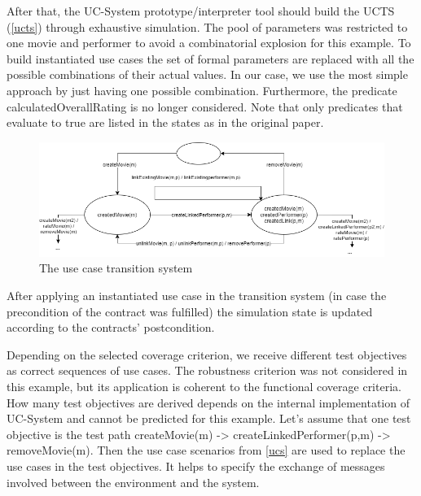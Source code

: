 After that, the UC-System prototype/interpreter tool should build the UCTS (\autoref{ucts}) through exhaustive simulation. The pool of parameters was restricted to one movie and performer to avoid a combinatorial explosion for this example. To build instantiated use cases the set of formal parameters are replaced with all the possible combinations of their actual values. In our case, we use the most simple approach by just having one possible combination. Furthermore, the predicate calculatedOverallRating is no longer considered. Note that only predicates that evaluate to true are listed in the states as in the original paper. 

\begin{figure}[h]
	\centering
	\includegraphics[width=\textwidth]{../images/topic3_ucts.png}
	\caption{The use case transition system}
	\label{ucts}
\end{figure}

\newpage
After applying an instantiated use case in the transition system (in case the precondition of the contract was fulfilled) the simulation state is updated according to the contracts' postcondition. 

Depending on the selected coverage criterion, we receive different test objectives as correct sequences of use cases. The robustness criterion was not considered in this example, but its application is coherent to the functional coverage criteria. How many test objectives are derived depends on the internal implementation of UC-System and cannot be predicted for this example. Let's assume that one test objective is the test path createMovie(m) \mbox{-\textgreater} createLinkedPerformer(p,m) \mbox{-\textgreater} removeMovie(m). Then the use case scenarios from \autoref{ucs} are used to replace the use cases in the test objectives. It helps to specify the exchange of messages involved between the environment and the system.

